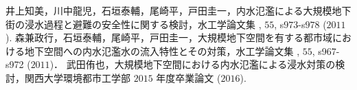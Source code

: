 \documentclass[a4paper,10pt]{jarticle}
\begin{document}
%
%

\begin{thebibliography}{9}
\vspace{-2.5mm}
井上知美，川中龍児，石垣泰輔，尾崎平，戸田圭一，内水氾濫による大規模地下街の浸水過程と避難の安全性に関する検討，水工学論文集 , $55$, s$973$-s$978$ ($2011$).
\vspace{-2mm}
森兼政行，石垣泰輔，尾崎平，戸田圭一，大規模地下空間を有する都市域における地下空間への内水氾濫水の流入特性とその対策，水工学論文集 , $55$, s967-s972 ($2011$)．
  \vspace{-2mm}
武田侑也，大規模地下空間における内水氾濫による浸水対策の検討，関西大学環境都市工学部 $2015$ 年度卒業論文 ($2016$).  
\end{thebibliography}
\end{document}
